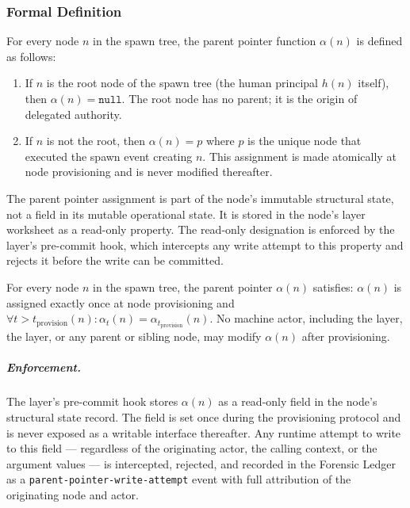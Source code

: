 \subsubsection{Formal Definition}\label{sec:parent-pointer-formal}

For every node $n$ in the spawn tree, the parent pointer function $\alpha(n)$ is defined as follows:

\begin{enumerate}\itemsep=0pt
\item[(\textit{i})] If $n$ is the root node of the spawn tree (the human principal $h(n)$ itself), then $\alpha(n) = \texttt{null}$. The root node has no parent; it is the origin of delegated authority.
\item[(\textit{ii})] If $n$ is not the root, then $\alpha(n) = p$ where $p$ is the unique node that executed the spawn event creating $n$. This assignment is made atomically at node provisioning and is never modified thereafter.
\end{enumerate}

The parent pointer assignment is part of the node's immutable structural state, not a field in its mutable operational state. It is stored in the node's \fact{} layer worksheet as a read-only property. The read-only designation is enforced by the \fact{} layer's pre-commit hook, which intercepts any write attempt to this property and rejects it before the write can be committed.

\begin{invariant}\label{inv:parent-pointer-immutability}
For every node $n$ in the spawn tree, the parent pointer $\alpha(n)$ satisfies: $\alpha(n)$ is assigned exactly once at node provisioning and $\forall t > t_{\text{provision}}(n) : \alpha_t(n) = \alpha_{t_{\text{provision}}}(n)$. No machine actor, including the \bounds{} layer, the \purpose{} layer, or any parent or sibling node, may modify $\alpha(n)$ after provisioning.
\end{invariant}

\subparagraph{Enforcement.} The \fact{} layer's pre-commit hook stores $\alpha(n)$ as a read-only field in the node's structural state record. The field is set once during the provisioning protocol and is never exposed as a writable interface thereafter. Any runtime attempt to write to this field --- regardless of the originating actor, the calling context, or the argument values --- is intercepted, rejected, and recorded in the Forensic Ledger as a \texttt{parent-pointer-write-attempt} event with full attribution of the originating node and actor.

